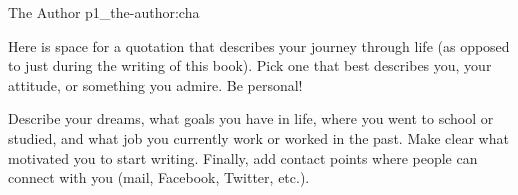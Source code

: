 
\begin{chapterpage}{
	{The Author}
}{p1_the-author:cha}

\vspace*{\fill}

\begin{center}


\end{center}
\vspace*{\fill}

\begin{myquotation} Here is space for a quotation that describes your journey through life (as opposed to just during the writing of this book). Pick one that best describes you, your attitude, or something you admire. Be personal!\end{myquotation}

\end{chapterpage}

Describe your dreams, what goals you have in life, where you went to school or studied, and what job you currently work or worked in the past. Make clear what motivated you to start writing. Finally, add contact points where people can connect with you (mail, Facebook, Twitter, etc.). 

